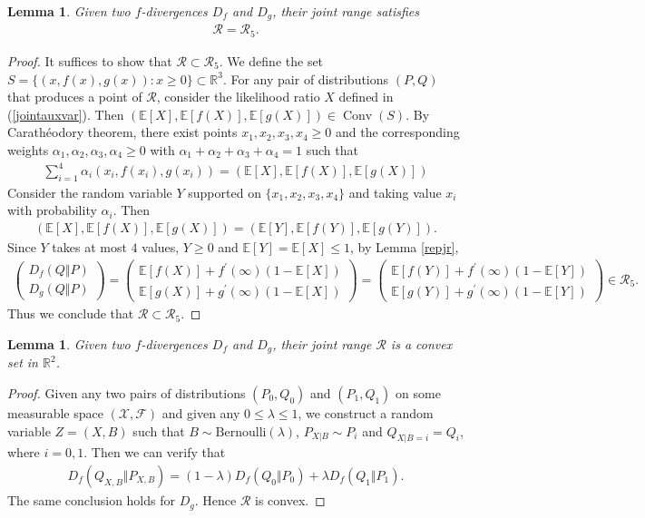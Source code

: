 \documentclass{article}
\numberwithin{equation}{section}
\newcommand{\E}{\mathbb{E}}
\newcommand{\bbR}{\mathbb{R}}
\renewcommand{\cal}{\mathcal}
\DeclareMathOperator{\conv}{Conv}
\theoremstyle{plain}
\newtheorem{lemma}[theorem]{Lemma}
\theoremstyle{definition}
\begin{document}
\begin{lemma}\label{simplifyjr}
Given two $f$-divergences $D_f$ and $D_g$, their joint range satisfies
\begin{align*}
	\cal{R}=\cal{R}_5.
\end{align*}
\end{lemma}
\begin{proof}
It suffices to show that $\cal{R}\subset\cal{R}_5$. We define the set $S=\{(x,f(x),g(x)):x\geq 0\}\subset\bbR^3$. For any pair of distributions $(P,Q)$ that produces a point of $\cal{R}$, consider the likelihood ratio $X$ defined in (\ref{jointauxvar}). Then $(\E[X],\E[f(X)],\E[g(X)])\in\conv(S)$. By Carathéodory theorem, there exist points $x_1,x_2,x_3,x_4\geq 0$ and the corresponding weights $\alpha_1,\alpha_2,\alpha_3,\alpha_4\geq 0$ with $\alpha_1+\alpha_2+\alpha_3+\alpha_4=1$ such that
\begin{align*}
	\sum_{i=1}^4\alpha_i(x_i,f(x_i),g(x_i))=(\E[X],\E[f(X)],\E[g(X)])
\end{align*}
Consider the random variable $Y$ supported on $\{x_1,x_2,x_3,x_4\}$ and taking value $x_i$ with probability $\alpha_i$. Then
\begin{align*}
	(\E[X],\E[f(X)],\E[g(X)])=(\E[Y],\E[f(Y)],\E[g(Y)]).
\end{align*}
Since $Y$ takes at most $4$ values, $Y\geq 0$ and $\E[Y]=\E[X]\leq 1$, by Lemma \ref{repjr},
\begin{align*}
\begin{pmatrix}
D_f(Q\Vert P)\\ D_g(Q\Vert P)
\end{pmatrix}=\begin{pmatrix}
		\E[f(X)]+f^\prime(\infty)(1-\E[X])\\
		\E[g(X)]+g^\prime(\infty)(1-\E[X])
	\end{pmatrix}=\begin{pmatrix}
	\E[f(Y)]+f^\prime(\infty)(1-\E[Y])\\
	\E[g(Y)]+g^\prime(\infty)(1-\E[Y])
\end{pmatrix}\in\cal{R}_5.
\end{align*}
Thus we conclude that $\cal{R}\subset\cal{R}_5$.
\end{proof}

\begin{lemma}\label{convexjr}
	Given two $f$-divergences $D_f$ and $D_g$, their joint range $\cal{R}$ is a convex set in $\bbR^2$.
\end{lemma}
\begin{proof}
Given any two pairs of distributions $(P_0, Q_0)$ and $(P_1, Q_1)$ on some
measurable space $(\cal{X},\mathscr{F})$ and given any $0\leq\lambda\leq 1$, we construct a random variable $Z=(X,B)$ such that $B\sim\mathrm{Bernoulli}(\lambda)$, $P_{X|B}\sim P_i$ and $Q_{X|B=i}=Q_i$, where $i=0,1$. Then we can verify that
\begin{align*}
	D_f(Q_{X,B}\Vert P_{X,B})=(1-\lambda)D_f(Q_0\Vert P_0)+\lambda D_f(Q_1\Vert P_1).
\end{align*}
The same conclusion holds for $D_g$. Hence $\cal{R}$ is convex.
\end{proof}
\end{document}
